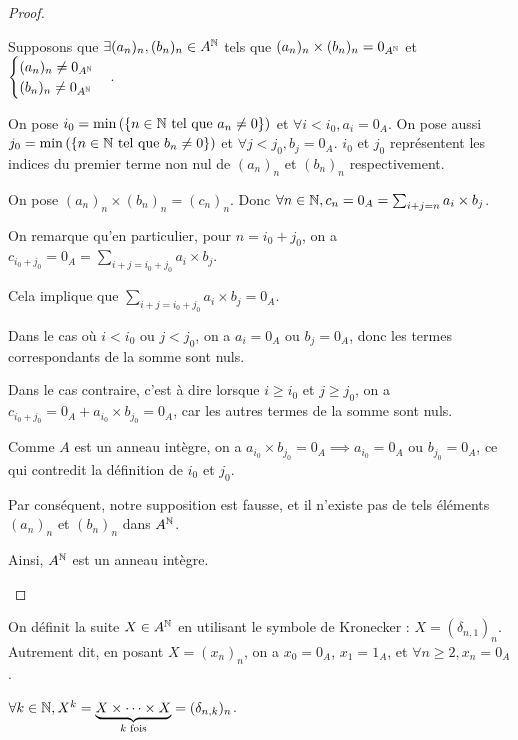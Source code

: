 \documentclass[12pt, a4paper]{report}
\begin{document}
\begin{proof}
    \begin{outline}
        \1 Supposons que $\exists (a_n)_n, (b_n)_n \in A^{\mathbb{N}}$ tels que $(a_n)_n \times (b_n)_n = 0_{A^{\mathbb{N}}}$ et $\begin{cases} (a_n)_n \neq 0_{A^{\mathbb{N}}}\\ (b_n)_n \neq 0_{A^{\mathbb{N}}} \end{cases}$.

    \1 On pose $i_0 = \min\left(\{n\in\mathbb{N} \text{ tel que } a_n \ne 0\}\right)$ et $\forall i < i_0, a_i = 0_A$. On pose aussi $j_0 = \min\left(\{n\in\mathbb{N} \text{ tel que } b_n \ne 0\}\right)$ et $\forall j < j_0, b_j = 0_A$. $i_0$ et $j_0$ représentent les indices du premier terme non nul de $(a_n)_n$ et $(b_n)_n$ respectivement.

    \1 On pose $(a_n)_n \times (b_n)_n = (c_n)_n$. Donc $\forall n \in \mathbb{N}, c_n = 0_A = \sum_{i+j=n} a_i \times b_j$.

    \2 On remarque qu'en particulier, pour $n = i_0 + j_0$, on a $c_{i_0 + j_0} = 0_A = \sum_{i+j=i_0+j_0} a_i \times b_j$.

    \2 Cela implique que $\sum_{i+j=i_0+j_0} a_i \times b_j = 0_A$.
    
    \3 Dans le cas où $i < i_0$ ou $j < j_0$, on a $a_i = 0_A$ ou $b_j = 0_A$, donc les termes correspondants de la somme sont nuls.

    \3 Dans le cas contraire, c'est à dire lorsque $i \ge i_0$ et $j \ge j_0$, on a $c_{i_0 + j_0} = 0_A + a_{i_0} \times b_{j_0} = 0_A$, car les autres termes de la somme sont nuls.

    \2 Comme $A$ est un anneau intègre, on a $a_{i_0} \times b_{j_0} = 0_A \implies a_{i_0} = 0_A$ ou $b_{j_0} = 0_A$, ce qui contredit la définition de $i_0$ et $j_0$.

    \1 Par conséquent, notre supposition est fausse, et il n'existe pas de tels éléments $(a_n)_n$ et $(b_n)_n$ dans $A^{\mathbb{N}}$.

    \1 Ainsi, $A^{\mathbb{N}}$ est un anneau intègre.
    \end{outline}
\end{proof}

\begin{definition}
    On définit la suite $X \in A^{\mathbb{N}}$ en utilisant le symbole de Kronecker : $X = (\delta_{n,1})_n$. Autrement dit, en posant $X=(x_n)_n$, on a $x_0 = 0_A$, $x_1 = 1_A$, et $\forall n \ge 2, x_n = 0_A$.
\end{definition}

\begin{property}
    $\forall k \in \mathbb{N}, X^k = \underbrace{X\times\dots\times X}_{k\text{ fois}} = (\delta_{n,k})_n$.
\end{property}
\end{document}
